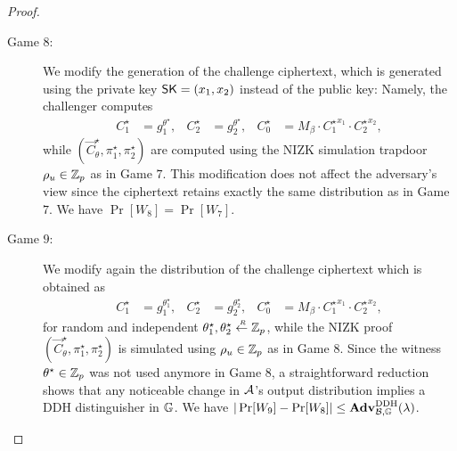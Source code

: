 \begin{proof}
\begin{description}
  \item[\textsf{Game} $8$:]  We modify the generation of the challenge ciphertext, which is generated using the private key $\mathsf{SK}=(x_1,x_2)$ instead
    of the public key: Namely, the challenger computes 
    \begin{align*}
      C_1^\star &= g_1^{\theta^\star}, & C_2^\star &= g_2^{\theta^\star},    &  C_0^\star &= M_{\beta} \cdot {C_1^\star}^{x_1} \cdot  {C_2^\star}^{x_2} , 
    \end{align*} 
    while $(\vec{C}_\theta^\star,\pi_1^\star,\pi_2^\star)$ are computed using the NIZK simulation trapdoor $\rho_u \in \mathbb{Z}_p$ as in Game $7$. 
    This modification does not affect the adversary's view since the ciphertext retains exactly the same distribution as in Game $7$. 
    We have $\Pr[W_8]=\Pr[W_7]$.  \smallskip \smallskip

  \item[\textsf{Game} $9$:] We modify again the distribution of the challenge ciphertext which is obtained as 
    \begin{align*}
      C_1^\star &= g_1^{\theta_1^\star}, & C_2^\star &= g_2^{\theta_2^\star},    &  C_0^\star &= M_{\beta} \cdot {C_1^\star}^{x_1} \cdot  {C_2^\star}^{x_2} , 
    \end{align*} 
    for random and independent $\theta_1^\star,\theta_2^\star \stackrel{{\scriptscriptstyle \mkern4mu R}}{\gets} \mathbb{Z}_p$, 
    while the NIZK proof $(\vec{C}_\theta^\star,\pi_1^\star,\pi_2^\star)$ is simulated using $\rho_u \in \mathbb{Z}_p$ as in Game $8$.  Since 
    the witness $\theta^\star \in \mathbb{Z}_p$ was not used anymore in Game $8$, a straightforward reduction shows that  any noticeable change in $\mathcal{A}$'s output distribution implies a DDH distinguisher in $\mathbb{G}$. We have 
    $|\Pr[W_9]-\Pr[W_8]| \leq   \mathbf{Adv}_{\mathcal{B},\mathbb{G}}^{\mathrm{DDH}}(\lambda)$. \medskip 


\end{description}
\end{proof}
